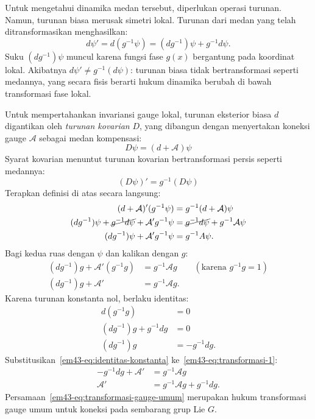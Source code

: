 Untuk mengetahui dinamika medan tersebut, diperlukan operasi turunan. Namun, turunan biasa merusak simetri lokal. Turunan dari medan yang telah ditransformasikan menghasilkan:
\begin{equation}
  d\psi' = d(g^{-1}\psi) = (dg^{-1})\psi + g^{-1}d\psi.
\end{equation}
Suku $(dg^{-1})\psi$ muncul karena fungsi fase $g(x)$ bergantung pada koordinat lokal. Akibatnya $d\psi' \neq g^{-1}(d\psi)$: turunan biasa tidak bertransformasi seperti medannya, yang secara fisis berarti hukum dinamika berubah di bawah transformasi fase lokal.

Untuk mempertahankan invariansi gauge lokal, turunan eksterior biasa $d$ digantikan oleh \emph{turunan kovarian} $D$, yang dibangun dengan menyertakan koneksi gauge $\mathcal{A}$ sebagai medan kompensasi:
\begin{equation}\label{em43-eq:turunan-kovarian}
  D\psi = (d + \mathcal{A})\psi
\end{equation}
Syarat kovarian menuntut turunan kovarian bertransformasi persis seperti medannya:
\begin{equation}\label{em43-eq:syarat-kovarian-gauge}
  (D\psi)' = g^{-1}(D\psi)
\end{equation}
Terapkan definisi di atas secara langsung:
\[
\begin{aligned}
  (d+\mathcal{A})'(g^{-1} \psi) &= g^{-1}(d+\mathcal{A})\psi  \\
  (dg^{-1})\psi + \cancel{g^{-1}d\psi}+ \mathcal{A'}g^{-1}\psi &= \cancel{g^{-1}d\psi} + g^{-1}\mathcal{A}\psi  \\
  (dg^{-1})\psi + \mathcal{A}'g^{-1}\psi &= g^{-1}A\psi.
\end{aligned}
\]
Bagi kedua ruas dengan $\psi$ dan kalikan dengan $g$:
\begin{align}
  (dg^{-1})g + \mathcal{A}'(g^{-1}g) &= g^{-1}\mathcal{A}g \qquad (\text{karena } g^{-1}g=1) \nonumber \\
  (dg^{-1})g + \mathcal{A}' &= g^{-1}\mathcal{A}g. \label{em43-eq:transformasi-1}
\end{align}
Karena turunan konstanta nol, berlaku identitas:
\begin{align}
  d(g^{-1}g)&=0 \nonumber \\
  (dg^{-1})g + g^{-1}dg&=0 \nonumber \\
  (dg^{-1})g &= - g^{-1}dg. \label{em43-eq:identitas-konstanta}
\end{align}
Substitusikan~\eqref{em43-eq:identitas-konstanta} ke~\eqref{em43-eq:transformasi-1}:
\begin{align}
  -g^{-1}dg+\mathcal{A}'&=g^{-1}\mathcal{A}g \nonumber \\
\mathcal{A}'&=g^{-1}\mathcal{A}g + g^{-1}dg. \label{em43-eq:transformasi-gauge-umum}
\end{align}
Persamaan~\eqref{em43-eq:transformasi-gauge-umum} merupakan hukum transformasi gauge umum untuk koneksi pada sembarang grup Lie $G$.

